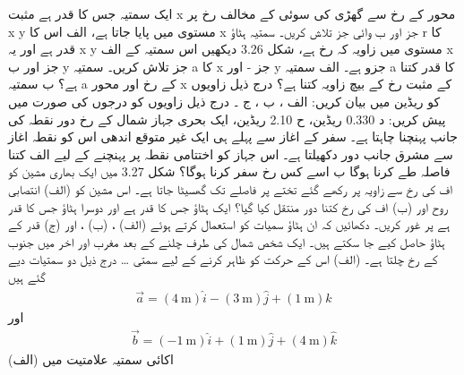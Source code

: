 ایک سمتیہ جس کا قدر
 ہے مثبت x محور کے رخ سے گھڑی کی سوئی کے مخالف رخ
 پر x y مستوی میں پایا جاتا ہے،
 الف اس کا x جز اور
ب  وائی جز تلاش کریں۔ 
سمتیہ ہٹاؤ r کا قدر   ہے اور یہ x y  مستوی میں زاویہ    کہ رخ ہے، شکل 3.26 دیکھیں اس سمتیہ کے الف x جز اور
 ب y جز تلاش کریں۔
 سمتیہ a کا x جز -    اور y جزو    ہے۔  الف سمتیہ a کا قدر کتنا ہے؟  ب سمتیہ a کے رخ اور محور x کے مثبت رخ کے بیچ زاویہ کتنا ہے؟ 
 درج ذیل زاویوں کو ریڈین میں بیان کریں: الف ، ب  ، ج  ۔ درج ذیل زاویوں کو درجوں کی صورت میں پیش کریں: د 0.330 ریڈین،  ح 2.10 ریڈین، 
 ایک بحری جہاز شمال کے رخ  دور نقطہ کی جانب پہنچنا چاہتا ہے۔ سفر کے اغاز سے پہلے ہی ایک غیر متوقع اندھی اس کو نقطہ اغاز سے مشرق جانب     دور دکھیلتا ہے۔ اس جہاز کو اختتامی نقطہ پر پہنچنے کے لیے الف کتنا فاصلہ طے کرنا ہوگا  ب اسے کس رخ سفر کرنا ہوگا؟
شکل 3.27 میں ایک بھاری مشین کو اف کی رخ سے زاویہ   پر رکھے گئے تختے پر   فاصلے تک گھسیٹا جاتا ہے۔ اس مشین کو (الف) انتصابی روح اور  (ب) اف کی رخ کتنا دور منتقل کیا گیا؟ 
ایک ہٹاؤ جس کا قدر    ہے اور دوسرا ہٹاؤ جس کا قدر    ہے پر غور کریں۔ دکھائیں کہ ان ہٹاؤ سمیات کو استعمال کرتے ہوئے  (الف) 
  ، (ب)   ، اور (ج)  قدر کے ہٹاؤ حاصل کیے جا سکتے ہیں۔ 
ایک شخص   شمال کی طرف چلنے کے بعد   مغرب اور اخر میں    جنوب کے رخ چلتا ہے۔ (الف) اس کے حرکت کو ظاہر کرنے کے لیے سمتی …
درج ذیل دو سمتیات دیے گئے ہیں 
\begin{align*}
\vec{a}=(\SI{4}{\meter})\hat{i} - (\SI{3}{\meter})\hat{j} + (\SI{1}{\meter})\hat{k}
\end{align*}
اور
\begin{align*}
\vec{b}=(\SI{-1}{\meter})\hat{i} + (\SI{1}{\meter})\hat{j} + (\SI{4}{\meter})\hat{k}
\end{align*}
اکائی سمتیہ علامتیت میں 
(الف)

